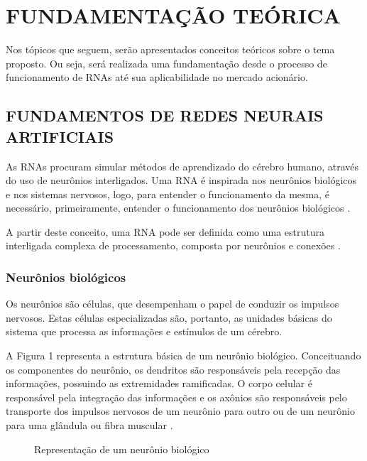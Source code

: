 
\chapter{FUNDAMENTAÇÃO TEÓRICA}\label{ch:fundaments-teorico}
Nos tópicos que seguem, serão apresentados conceitos teóricos sobre o tema proposto. Ou seja, será realizada uma fundamentação desde o processo de funcionamento de RNAs até sua aplicabilidade no mercado acionário.

\section{FUNDAMENTOS DE REDES NEURAIS ARTIFICIAIS}\label{sec:fundamentos}
As RNAs procuram simular métodos de aprendizado do cérebro humano, através do uso de neurônios interligados. Uma RNA é inspirada nos neurônios biológicos e nos sistemas nervosos, logo, para entender o funcionamento da mesma, é necessário, primeiramente, entender o funcionamento dos neurônios biológicos \cite{neto}.

A partir deste conceito, uma RNA pode ser definida como uma estrutura interligada complexa de processamento, composta por neurônios e conexões \cite{ferreira}.

\subsection{Neurônios biológicos} 
Os neurônios são células, que desempenham o papel de conduzir os impulsos nervosos. Estas células especializadas são, portanto, as unidades básicas do sistema que processa as informações e estímulos de um cérebro\cite{lent}. 

A Figura 1 representa a estrutura básica de um neurônio biológico. Conceituando os componentes do neurônio, os dendritos são responsáveis pela recepção das informações, possuindo as extremidades ramificadas. O corpo celular é responsável pela integração das informações e os axônios são responsáveis pelo transporte dos impulsos nervosos de um neurônio para outro ou de um neurônio para uma glândula ou fibra muscular \cite{lent}.

\begin{figure}[h]
	\centering
	\caption{Representação de um neurônio biológico}
	\label{exec-linearmente-separavel}
\end{figure} 

